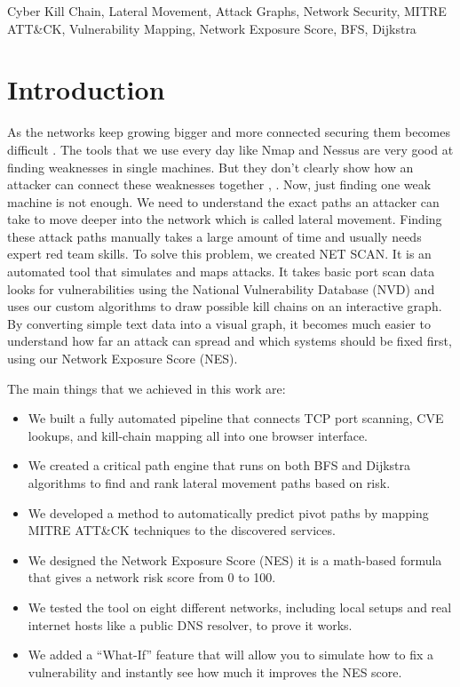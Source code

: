 \documentclass[conference]{IEEEtran}
\begin{document}
\begin{IEEEkeywords}
Cyber Kill Chain, Lateral Movement, Attack Graphs, Network Security, MITRE ATT\&CK, Vulnerability Mapping, Network Exposure Score, BFS, Dijkstra
\end{IEEEkeywords}

\section{Introduction}
As the networks keep growing bigger and more connected securing them becomes difficult . The tools that we use every day like Nmap and Nessus are very good at finding weaknesses in single machines. But they don't clearly show how an attacker can connect these weaknesses together \cite{nmap_ref}, \cite{nessus_ref}. Now, just finding one weak machine is not enough. We need to understand the exact paths an attacker can take to move deeper into the network which is called lateral movement. Finding these attack paths manually takes a large amount of time and usually needs expert red team skills. To solve this problem, we created NET SCAN. It is an automated tool that simulates and maps attacks. It takes basic port scan data looks for vulnerabilities using the National Vulnerability Database (NVD) \cite{nvd_ref} and uses our custom algorithms to draw possible kill chains on an interactive graph. By converting simple text data into a visual graph, it becomes much easier to understand how far an attack can spread and which systems should be fixed first, using our Network Exposure Score (NES).

The main things that we achieved in this work are:
\begin{itemize}
    \item We built a fully automated pipeline that connects TCP port scanning, CVE lookups, and kill-chain mapping all into one browser interface.
    \item We created a critical path engine that runs on both BFS and Dijkstra algorithms to find and rank lateral movement paths based on risk.
    \item We developed a method to automatically predict pivot paths by mapping MITRE ATT\&CK techniques to the discovered services.
    \item We designed the Network Exposure Score (NES) it is a math-based formula that gives a network risk score from 0 to 100.
    \item We tested the tool on eight different networks, including local setups and real internet hosts like a public DNS resolver, to prove it works.
    \item We added a ``What-If'' feature that will allow you to simulate how to fix a vulnerability and instantly see how much it improves the NES score.
\end{itemize}
\end{document}

